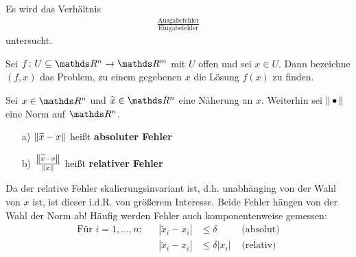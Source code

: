  \label{3.2}
Es wird das Verhältnis 
\begin{gather*}
  \frac{\text{Ausgabefehler}}{\text{Eingabefehler}}
\end{gather*}
untersucht.

\begin{Defe}
  \label{3.2.1} 
  Sei $f\colon U \subseteq \R^n \to \R^m$ mit $U$ offen und sei $x\in U$.
  Dann bezeichne $(f, x)$ das Problem, 
  zu einem gegebenen $x$ die Lösung $f(x)$ zu finden.
\end{Defe}

\begin{Defe}
  \label{3.2.2} 
  Sei $x\in\R^n$ und $\widetilde{x} \in \R^n$ eine Näherung an $x$. 
  Weiterhin sei $\nn$ eine Norm auf $\R^n$.
  \begin{itemize}
  \item[a)] $\nn[\widetilde{x} - x]$ heißt \textbf{absoluter Fehler} 
  \item[b)] $\frac{\nn[\widetilde{x} - x]}{\nn[x]}$ heißt \textbf{relativer Fehler}
  \end{itemize}
  Da der relative Fehler skalierungsinvariant ist, 
  d.h. unabhänging von der  Wahl von $x$ ist, ist dieser i.d.R. von größerem Interesse.
  Beide Fehler hängen von der Wahl der Norm ab!
  Häufig werden Fehler auch komponentenweise gemessen:
  \begin{align*}
    \text{Für } i=1,\dotsc , n : 
    && |\widetilde{x}_i - x_i | & \leq \delta & \text{ (absolut)} \\
    && |\widetilde{x}_i - x_i | &\leq \delta |x_i| & \text{ (relativ)}
  \end{align*}
\end{Defe}

